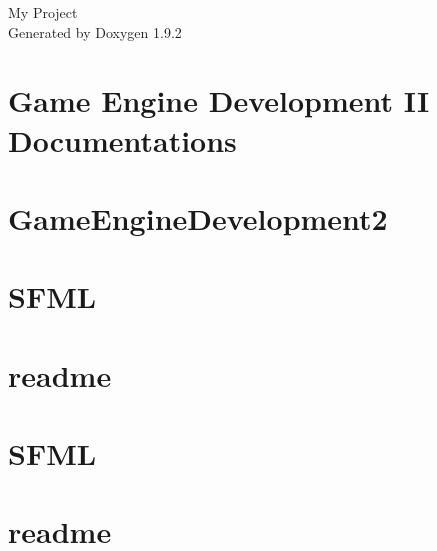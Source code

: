 \documentclass[twoside]{book}
\newcommand{\+}{\discretionary{\mbox{\scriptsize$\hookleftarrow$}}{}{}}
\newcommand{\clearemptydoublepage}{%
    \newpage{\pagestyle{empty}\cleardoublepage}%
  }
\begin{document}
  \raggedbottom
    \hypersetup{pageanchor=false,
                bookmarksnumbered=true,
                pdfencoding=unicode
               }
  \begin{titlepage}
  \vspace*{7cm}
  \begin{center}%
  {\Large My Project}\\
  \vspace*{1cm}
  {\large Generated by Doxygen 1.9.2}\\
  \end{center}
  \end{titlepage}
  \clearemptydoublepage
  \tableofcontents
  \clearemptydoublepage
  \hypersetup{pageanchor=true}
\chapter{Game Engine Development II Documentations}
\label{index}\hypertarget{index}{}
\chapter{Game\+Engine\+Development2}
\label{md__r_e_a_d_m_e}

\chapter{SFML}
\label{md__s_f_m_l_2_5_1_license}

\chapter{readme}
\label{md__s_f_m_l_2_5_1_readme}

\chapter{SFML}
\label{md__week14__s_f_m_l_2_5_1_license}

\chapter{readme}
\label{md__week14__s_f_m_l_2_5_1_readme}

\end{document}
